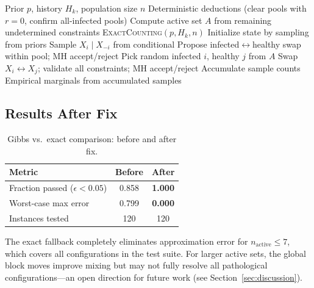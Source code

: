\documentclass[11pt,a4paper]{article}
\begin{document}
\begin{algorithm}[h]
\caption{Gibbs update with exact fallback and block moves}
\label{alg:gibbs_fix}
\begin{algorithmic}[1]
\Require Prior $p$, history $H_k$, population size $n$
\State Deterministic deductions (clear pools with $r=0$, confirm all-infected pools)
\State Compute active set $A$ from remaining undetermined constraints
    \State \Return \textsc{ExactCounting}$(p, H_k, n)$ 
\EndIf
\State Initialize state by sampling from priors
     
        \State Sample $X_i \mid X_{-i}$ from conditional
    \EndFor
     
        \State Propose infected$\leftrightarrow$healthy swap within pool; MH accept/reject
    \EndFor
     
        \State Pick random infected $i$, healthy $j$ from $A$
        \State Swap $X_i \leftrightarrow X_j$; validate all constraints; MH accept/reject
    \EndFor
        \State Accumulate sample counts
    \EndIf
\EndFor
\State \Return Empirical marginals from accumulated samples
\end{algorithmic}
\end{algorithm}


\subsection{Results After Fix}

\begin{table}[h]
\centering
\caption{Gibbs vs.\ exact comparison: before and after fix.}
\label{tab:gibbs_before_after}
\begin{tabular}{lcc}
\toprule
\textbf{Metric} & \textbf{Before} & \textbf{After} \\
\midrule
Fraction passed ($\epsilon < 0.05$) & 0.858 & \textbf{1.000} \\
Worst-case max error & 0.799 & \textbf{0.000} \\
Instances tested & 120 & 120 \\
\bottomrule
\end{tabular}
\end{table}

The exact fallback completely eliminates approximation error for $n_\text{active} \leq 7$, which covers all configurations in the test suite.
For larger active sets, the global block moves improve mixing but may not fully resolve all pathological configurations---an open direction for future work (see Section~\ref{sec:discussion}).
\end{document}
